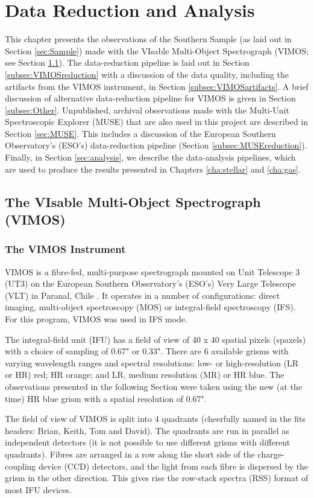 \chapter{Data Reduction and Analysis}
	\label{cha:Data}
This chapter presents the observations of the Southern Sample (as laid out in Section \ref{sec:Sample}) made with the VIsable Multi-Object Spectrograph (VIMOS; see Section \ref{sec:VIMOS}). The data-reduction pipeline is laid out in Section \ref{subsec:VIMOSreduction} with a discussion of the data quality, including the artifacts from the VIMOS instrument, in Section \ref{subsec:VIMOSartifacts}. A brief discussion of alternative data-reduction pipeline for VIMOS is given in Section \ref{subsec:Other}. Unpublished, archival observations made with the Multi-Unit Spectroscopic Explorer (MUSE) that are also used in this project are described in Section \ref{sec:MUSE}. This includes a discussion of the European Southern Observatory's (ESO's) data-reduction pipeline (Section \ref{subsec:MUSEreduction}). Finally, in Section \ref{sec:analysis}, we describe the data-analysis pipelines, which are used to produce the results presented in Chapters \ref{cha:stellar} and \ref{cha:gas}.  

\section{The VIsable Multi-Object Spectrograph (VIMOS)}
	\label{sec:VIMOS}
	\subsection{The VIMOS Instrument}
		VIMOS is a fibre-fed, multi-purpose spectrograph mounted on Unit Telescope 3 (UT3) on the European Southern Observatory's (ESO's) Very Large Telescope (VLT) in Paranal, Chile \citep{LeFevre2003}. It operates in a number of configurations: direct imaging, multi-object spectroscopy (MOS) or integral-field spectroscopy (IFS). For this program, VIMOS was used in IFS mode. 

		The integral-field unit (IFU) has a field of view of 40 x 40 spatial pixels (spaxels) with a choice of sampling of 0.67" or 0.33". There are 6 available grisms with varying wavelength ranges and spectral resolutions: low- or high-resolution (LR or HR) red; HR orange; and LR, medium resolution (MR) or HR blue. The observations presented in the following Section were taken using the new (at the time) HR blue grism with a spatial resolution of 0.67". 

		The field of view of VIMOS is split into 4 quadrants (cheerfully named in the fits headers: Brian, Keith, Tom and David). The quadrants are run in parallel as independent detectors (it is not possible to use different grisms with different quadrants). Fibres are arranged in a row along the short side of the charge-coupling device (CCD) detectors, and the light from each fibre is dispersed by the grism in the other direction. This gives rise the row-stack spectra (RSS) format of most IFU devices.

